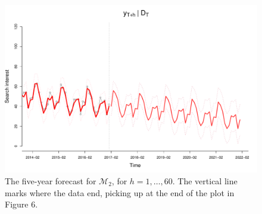 \documentclass[12pt]{article}
\begin{document}
\begin{figure}[H]
\begin{center}
\includegraphics[scale=0.37]{figs/m2_forecast.pdf}
\end{center}
\caption{The five-year forecast for $\mathcal{M}_2$, for $h=1,\ldots,60$. The vertical line marks where the data end, picking up at the end of the plot in Figure 6.}
\end{figure}
\end{document}

